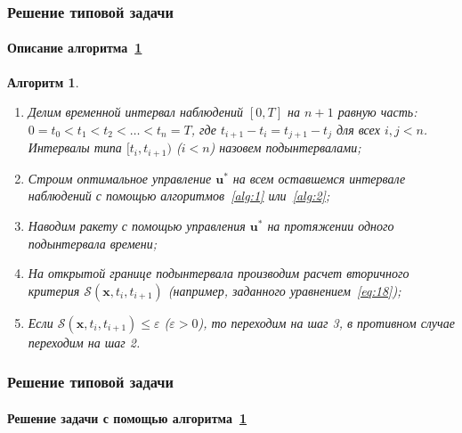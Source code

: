 \documentclass[ignorenonframetext,hyperref={pdftex,unicode,pdfpagelabels=false},compress]{beamer}
\newtheorem{alg}{Алгоритм}
\begin{document}
\begin{frame}
    \frametitle{Решение типовой задачи}
    \framesubtitle{Описание алгоритма~\ref{alg:3}}\small

    \begin{alg}\label{alg:3}~
        \begin{enumerate}
            \item
                Делим временной интервал наблюдений $[0, T]$ на $n+1$ равную часть: $0 = t_0 < t_1 < t_2 < \ldots < t_{n} = T$, где $t_{i+1}-t_i = t_{j+1}-t_j$ для всех $i, j < n$. Интервалы типа $[t_i, t_{i+1})$ ($i<n$) назовем \emph{подынтервалами};

            \item
                Строим оптимальное управление $\mathbf{u}^*$ на всем оставшемся интервале наблюдений с помощью алгоритмов~\ref{alg:1} или~\ref{alg:2};

            \item
                Наводим ракету с помощью управления $\mathbf{u}^*$ на протяжении одного подынтервала времени;

            \item
                На открытой границе подынтервала производим расчет вторичного критерия $\mathscr{S}(\mathbf{x}, t_i, t_{i+1})$ (например, заданного уравнением~\ref{eq:18});

            \item
                Если $\mathscr{S}(\mathbf{x}, t_i, t_{i+1}) \leqslant \varepsilon$ ($\varepsilon > 0$), то переходим на шаг 3, в противном случае переходим на шаг 2.
        \end{enumerate}
    \end{alg}
\end{frame}



\begin{frame}
    \frametitle{Решение типовой задачи}
    \framesubtitle{Решение задачи с помощью алгоритма~\ref{alg:3}}

    \begin{figure}\center
        
        \label{fig:alg3}
    \end{figure}
\end{frame}
\end{document}
